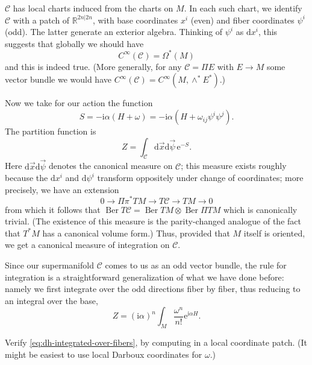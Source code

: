 \documentclass[12pt,letterpaper,reqno]{article}
\numberwithin{equation}{section}
\newcommand{\cC}{\ensuremath{\mathcal C}}
\newcommand{\R}{\ensuremath{\mathbb R}}
\newcommand{\I}{{\mathrm i}}
\newcommand{\e}{{\mathrm e}}
\newcommand{\de}{\mathrm{d}}
\DeclareMathOperator{\Ber}{Ber}
\begin{document}
$\cC$ has local charts induced from the charts on $M$.
In each such chart, we identify $\cC$ with a patch of 
$\R^{2n \vert 2n}$, with base coordinates $x^i$ (even)
and fiber coordinates $\psi^i$ (odd). The latter generate an
exterior algebra. Thinking of $\psi^i$ as $\de x^i$, this
suggests that globally we should have
\begin{equation}
  C^\infty(\cC) = \Omega^*(M)
\end{equation}
and this is indeed true.
(More generally, for any $\cC = \Pi E$ with $E \to M$ some vector
bundle we would have $C^\infty(\cC) = C^\infty(M, \wedge^* E^*)$.)

Now we take for our action the function
\begin{equation}
  S = -\I \alpha (H + \omega) = -\I \alpha (H + \omega_{ij} \psi^i \psi^j).
\end{equation}
The partition function is
\begin{equation}
  Z = \int_\cC \de \vec{x} \de \vec{\psi} \, \e^{-S}.
\end{equation}
Here $\de \vec{x} \de \vec{\psi}$ denotes the canonical measure
on $\cC$; this measure exists roughly because the
$\de x^i$ and $\de \psi^i$ transform oppositely under
change of coordinates; more precisely, we have an extension
\begin{equation}
  0 \to \Pi \pi^* TM \to T\cC \to TM \to 0
\end{equation}
from which it follows that $\Ber T\cC = \Ber TM \otimes \Ber \Pi TM$
which is canonically trivial. (The existence of this measure is
the parity-changed analogue of the fact that $T^* M$ has a canonical
volume form.) Thus, provided that $M$ itself is oriented,
we get a canonical measure of integration on $\cC$.

Since our supermanifold $\cC$ comes to us as an odd vector bundle, the
rule for integration is a straightforward generalization of what we
have done before: namely we first integrate over the odd directions fiber
by fiber, thus reducing to an integral over the base,
\begin{equation} \label{eq:dh-integrated-over-fibers}
  Z = (\I \alpha)^n \int_M \frac{\omega^n}{n!} \e^{\I \alpha H}.
\end{equation}

\begin{exercise} Verify \eqref{eq:dh-integrated-over-fibers}, by 
computing in a local coordinate patch. (It might be easiest to use 
local Darboux coordinates for $\omega$.)
\end{exercise}
\end{document}
